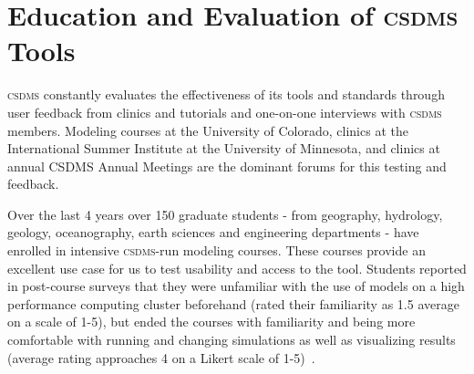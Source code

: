 \documentclass[11pt, oneside]{amsart}
\DeclareRobustCommand{\csdms}{\textsc{csdms}}
\DeclareRobustCommand{\wmt}{\textsc{wmt}}
\begin{document}

\section{Education and Evaluation of \csdms{} Tools}
\label{sec:education}


\csdms{} constantly evaluates the effectiveness of its tools and standards
through user feedback from clinics and tutorials and one-on-one interviews
with \csdms{} members.  Modeling courses at the University of Colorado,
clinics at the International Summer Institute at the University of Minnesota,
and clinics at annual CSDMS Annual Meetings are the dominant forums for
this testing and feedback. 

Over the last 4 years over 150 graduate students - from geography, hydrology,
geology, oceanography, earth sciences and engineering departments - have
enrolled in intensive \csdms{}-run modeling courses. These courses
provide an excellent use case for us to test usability and access to the
tool. Students reported in post-course surveys that they were unfamiliar with
the use of models on a high performance computing cluster beforehand (rated
their familiarity as 1.5 average on a scale of 1-5), but ended the courses
with familiarity and being more comfortable with running and changing
simulations as well as visualizing results (average rating approaches 4 on
a Likert scale of 1-5)~\cite{overeem2013strategies}. 
\end{document}
